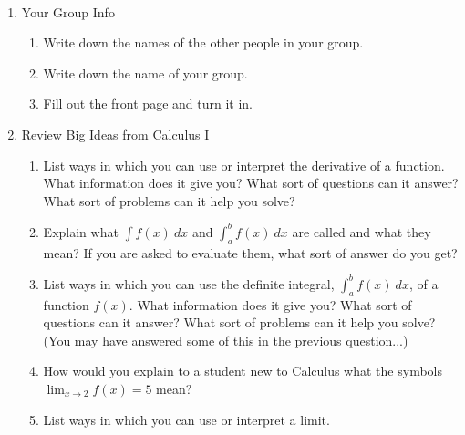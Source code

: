 \documentclass[11pt,fleqn]{article}
\begin{document}
\renewcommand{\headrulewidth}{0pt}
\newcommand{\blank}[1]{\rule{#1}{0.75pt}}
\newcommand{\bc}{\begin{center}}
\newcommand{\ec}{\end{center}}
\renewcommand{\d}{\displaystyle}

\vspace*{-0.7in}

\begin{center}
  \large
  \\
\end{center}

\begin{enumerate}
\item {\Large{Your Group Info}}
	\begin{enumerate}
	\item Write down the names of the other people in your group. 
	\vspace{1.3in}
	\item Write down the name of your group.
	\vspace{0.5in}
	\item Fill out the front page and turn it in.
	\end{enumerate}
\item  {\Large{Review Big Ideas from Calculus I}}
	\begin{enumerate}
	\item List ways in which you can use or interpret the derivative of a function. What information does it give you? What sort of questions can it answer? What sort of problems can it help you solve?
	\vfill
	\item Explain what $\displaystyle{\int f(x) \: dx}$ and  $\displaystyle{\int_a^b f(x) \: dx}$ are called and what they mean? If you are asked to evaluate them, what sort of answer do you get?
	\vfill
	\newpage
	\item List ways in which you can use the definite integral,   $\displaystyle{\int_a^b f(x) \: dx}$, of a function $f(x).$ What information does it give you? What sort of questions can it answer? What sort of problems can it help you solve? (You may have answered some of this in the previous question...)
	\vfill
	\item How would you explain to a student new to Calculus what the symbols $\displaystyle{\lim_{x \to 2} f(x)=5}$ mean?
	
	\vspace{1in}
	
	\item List ways in which you can use or interpret a limit. 
\vfill
	
\end{enumerate}
\end{enumerate}
\end{document}
